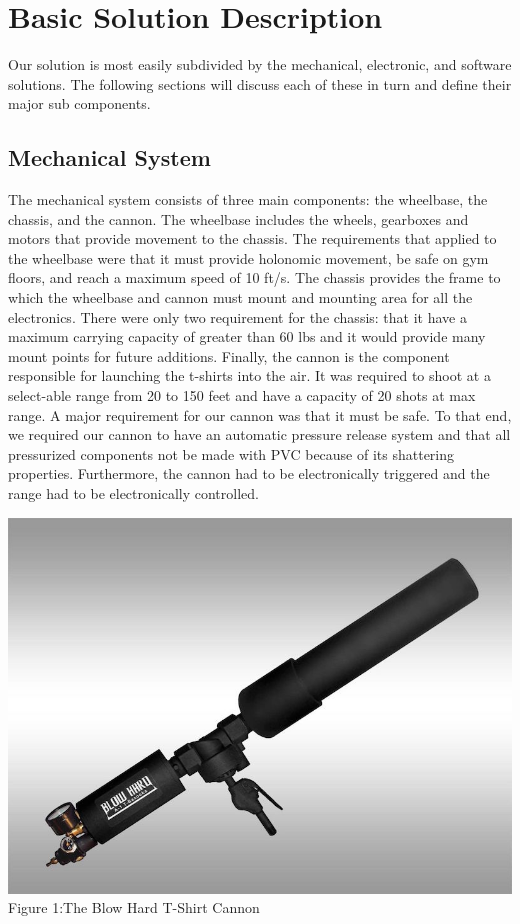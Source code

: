 \documentclass[letterpaper,12pt]{article}
\begin{document}
\section{Basic Solution Description}
\label{sec:basicsoldesc}

Our solution is most easily subdivided by the mechanical, electronic, and
software solutions. The following sections will discuss each of these in turn
and define their major sub components.

\subsection{Mechanical System}
The mechanical system consists of three main components: the wheelbase, the
chassis, and the cannon. The wheelbase includes the wheels, gearboxes and
motors that provide movement to the chassis. The requirements that applied to
the wheelbase were that it must provide holonomic movement, be safe on gym
floors, and reach a maximum speed of 10 ft/s. The chassis provides the frame to
which the wheelbase and cannon must mount and mounting area for all the
electronics. There were only two requirement for the chassis: that it have
a maximum carrying capacity of greater than 60 lbs and it would provide many
mount points for future additions. Finally, the cannon is the component
responsible for launching the t-shirts into the air. It was required to shoot
at a select-able range from 20 to 150 feet and have a capacity of 20 shots at
max range. A major requirement for our cannon was that it must be safe. To that
end, we required our cannon to have an automatic pressure release system and
that all pressurized components not be made with PVC because of its shattering
properties. Furthermore, the cannon had to be electronically triggered and the
range had to be electronically controlled.

\begin{center}
    \includegraphics[width=15cm]{./pics/cannon/blowhard_cannon.jpg}\\
     Figure 1:The Blow Hard T-Shirt Cannon
\end{center}
\end{document}
